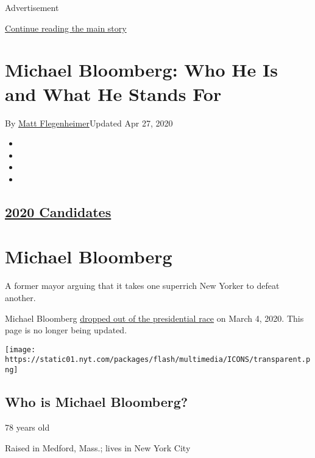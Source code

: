 Advertisement

\protect\hyperlink{after-top}{Continue reading the main story}

\hypertarget{michael-bloomberg-who-he-is-and-what-he-stands-for}{%
\section{Michael Bloomberg: Who He Is and What He Stands
For}\label{michael-bloomberg-who-he-is-and-what-he-stands-for}}

By \href{https://www.nytimes.com/by/matt-flegenheimer}{Matt
Flegenheimer}Updated Apr 27, 2020

\begin{itemize}
\item
\item
\item
\item
\end{itemize}

\hypertarget{2020-candidates-}{%
\subsection{\texorpdfstring{\href{https://www.nytimes.com/interactive/2019/us/politics/2020-presidential-candidates.html}{2020
Candidates} }{2020 Candidates }}\label{2020-candidates-}}

\hypertarget{michael-bloomberg}{%
\section{Michael Bloomberg}\label{michael-bloomberg}}

A former mayor arguing that it takes one superrich New Yorker to defeat
another.

Michael Bloomberg
\href{https://www.nytimes.com/2020/03/04/us/politics/michael-bloomberg-drops-out.html}{dropped
out of the presidential race} on March 4, 2020. This page is no longer
being updated.

\texttt{[image: https://static01.nyt.com/packages/flash/multimedia/ICONS/transparent.png]}

\hypertarget{who-is-michael-bloomberg}{%
\subsection{Who is Michael Bloomberg?}\label{who-is-michael-bloomberg}}

78 years old

Raised in Medford, Mass.; lives in New York City

